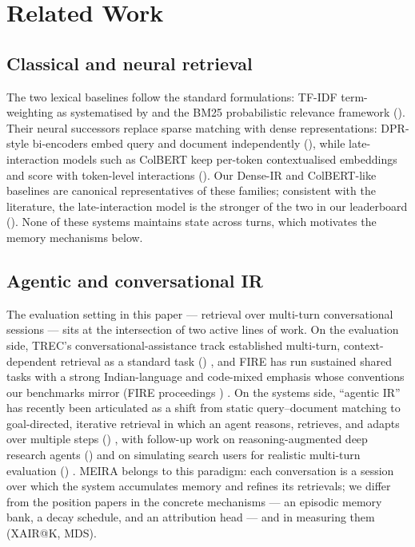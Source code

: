 \section{Related Work}
\label{sec:rw}

\subsection{Classical and neural retrieval}
\label{sec:rw-classical}

The two lexical baselines follow the standard formulations: TF-IDF term-weighting as systematised by \citet{salton1988termweighting} and the BM25 probabilistic relevance framework (\citep{robertson2009probabilistic}). Their neural successors replace sparse matching with dense representations: DPR-style bi-encoders embed query and document independently (\citep{karpukhin2020dense}), while late-interaction models such as ColBERT keep per-token contextualised embeddings and score with token-level interactions (\citep{khattab2020colbert}). Our Dense-IR and ColBERT-like baselines are canonical representatives of these families; consistent with the literature, the late-interaction model is the stronger of the two in our leaderboard (). None of these systems maintains state across turns, which motivates the memory mechanisms below.

\subsection{Agentic and conversational IR}
\label{sec:rw-agentic}

The evaluation setting in this paper --- retrieval over multi-turn conversational sessions --- sits at the intersection of two active lines of work. On the evaluation side, TREC's conversational-assistance track established multi-turn, context-dependent retrieval as a standard task (\citep{dalton2020cast}) , and FIRE has run sustained shared tasks with a strong Indian-language and code-mixed emphasis whose conventions our benchmarks mirror (FIRE proceedings \citep{fire2025proceedings}) . On the systems side, ``agentic IR'' has recently been articulated as a shift from static query--document matching to goal-directed, iterative retrieval in which an agent reasons, retrieves, and adapts over multiple steps (\citep{zhang2024agentic}) , with follow-up work on reasoning-augmented deep research agents (\citep{zhang2025websearch})  and on simulating search users for realistic multi-turn evaluation (\citep{zhang2024usimagent}) . MEIRA belongs to this paradigm: each conversation is a session over which the system accumulates memory and refines its retrievals; we differ from the position papers in the concrete mechanisms --- an episodic memory bank, a decay schedule, and an attribution head --- and in measuring them (XAIR@K, MDS).

